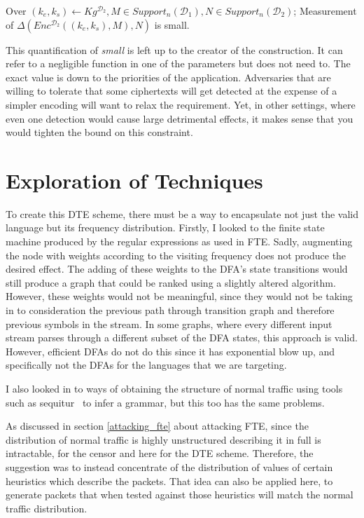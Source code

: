\documentclass[ %
                    author={Samuel Russell},
                supervisor={Prof. Bogdan Warinschi},
                    degree={MEng},
                     title={Innocuous Ciphertexts},
                  subtitle={The DE-CENSOR Scheme},
                      type={research},
                      year={2018} ]{dissertation}
\begin{document}
Over $ (k_e,k_s) \leftarrow Kg^{\mathcal{D}_2}, M \in Support_n(\mathcal{D}_1), N \in Support_n(\mathcal{D}_2)$; Measurement of $\Delta \left(  Enc^{\mathcal{D}_2}((k_e,k_s), M), N  \right)$ is small.

This quantification of \textit{small} is left up to the creator of the construction.
It can refer to a negligible function in one of the parameters but does not need to.
The exact value is down to the priorities of the application.
Adversaries that are willing to tolerate that some ciphertexts will get detected at the expense of a simpler encoding will want to relax the requirement.
Yet, in other settings, where even one detection would cause large detrimental effects, it makes sense that you would tighten the bound on this constraint.

\section{Exploration of Techniques}\label{exploration_of_techniques}

To create this DTE scheme, there must be a way to encapsulate not just the valid language but its frequency distribution.
Firstly, I looked to the finite state machine produced by the regular expressions as used in FTE. Sadly, augmenting the node with weights according to the visiting frequency does not produce the desired effect.
The adding of these weights to the DFA's state transitions would still produce a graph that could be ranked using a slightly altered algorithm.
However, these weights would not be meaningful, since they would not be taking in to consideration the previous path through transition graph and therefore previous symbols in the stream.
In some graphs, where every different input stream parses through a different subset of the DFA states, this approach is valid.
However, efficient DFAs do not do this since it has exponential blow up, and specifically not the DFAs for the languages that we are targeting.

I also looked in to ways of obtaining the structure of normal traffic using tools such as sequitur~\cite{sequitur} to infer a grammar, but this too has the same problems. 

As discussed in section \ref{attacking_fte} about attacking FTE, since the distribution of normal traffic is highly unstructured describing it in full is intractable, for the censor and here for the DTE scheme.
Therefore, the suggestion was to instead concentrate of the distribution of values of certain heuristics which describe the packets.
That idea can also be applied here, to generate packets that when tested against those heuristics will match the normal traffic distribution.
\end{document}
